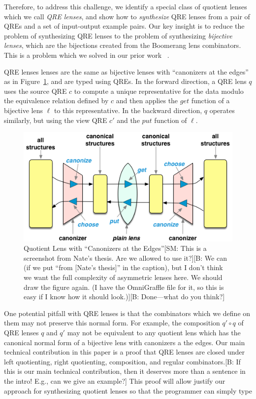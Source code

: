 \documentclass{svproc}
\newcommand{\FINISH}[3]{\ifdraft\textcolor{#1}{[#2: #3]}\fi}
\newcommand{\bcp}[1]{\FINISH{dkred}{B}{#1}}
\newcommand{\sam}[1]{\FINISH{dkpurple}{SM}{#1}}
\newcommand{\get}{\ensuremath{\mathit{get}}}
\newcommand{\lput}{\ensuremath{\mathit{put}}}
\begin{document}
Therefore, to address this challenge, we identify a special class of quotient
lenses which we call {\em QRE lenses}, and show how to {\em
synthesize} QRE lenses from a pair of QREs and a set of input-output
example pairs. Our key insight is to reduce the problem of synthesizing QRE
lenses to the problem of synthesizing {\em bijective lenses}, which are the
bijections created from the Boomerang lens combinators. This is a problem
which we solved in our prior work ~\cite{popl18}.

QRE lenses lenses are the same as bijective lenses with ``canonizers at the
edges'' as in Figure~\ref{fig:attheedges}, and are typed using QREs. In the
forward direction, a QRE lens $q$ uses the source QRE $c$ to compute a unique
representative for the data modulo the equivalence relation defined by $c$ and
then applies the $\get$ function of a bijective lens $\ell$ to this
representative. In the backward direction, $q$ operates similarly,  but using
the view QRE $c'$ and the $\lput$ function of $\ell$.

\begin{figure}[t]
  \centering
  \includegraphics[width=\textwidth]{canonizers-outside}
  \caption{Quotient Lens with ``Canonizers at the Edges''\sam{This is a
      screenshot from Nate's thesis. Are we allowed to use it?}\bcp{We can
      (if we put ``from [Nate's thesis]'' in the caption), but I don't think
      we want the full complexity of asymmetric lenses here.  We should draw
      the figure again.  (I have the OmniGraffle file for it, so this is
      easy if I know how it should look.)}\bcp{Done---what do you think?}}
  \label{fig:attheedges}
\end{figure}

One potential pitfall with QRE lenses is that the combinators which
we define on them may not preserve this normal form. For example, the
composition $q' \circ q$ of QRE lenses $q$ and $q'$ may not be equivalent to
any quotient lens which has the canonical normal form of a bijective lens with
canonizers a the edges. Our main technical contribution in this paper is a
proof that QRE lenses are closed under left quotienting, right quotienting,
composition, and regular combinators.\bcp{If this is our main technical
  contribution, then it deserves more than a sentence in the intro!  E.g.,
  can we give an example?} This proof will allow justify our
approach for synthesizing quotient lenses so that the programmer can simply
type
\end{document}
